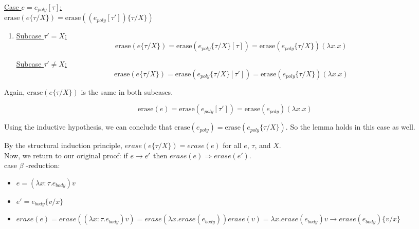 \documentclass[10pt]{article}
\begin{document}
\begin{exercise}
\begin{enumerate}[\hspace{20pt}]
	\underline{Case $e = e_{poly} [\tau]$:} \\
	
	$\text{erase}(e\{\tau / X\}) = \text{erase}((e_{poly} [\tau']) \{\tau / X \})$
	
	\begin{enumerate}[\hspace{20pt}]
		\item
		\underline{Subcase $\tau' = X$:}
		$$\text{erase}(e\{\tau / X\}) = \text{erase}(e_{poly}\{\tau / X\} [\tau]) = 
		\text{erase}(e_{poly}\{\tau / X\}) (\lambda x.x)$$
		
		\underline{Subcase $\tau' \neq X$:} \\
		$$\text{erase}(e\{\tau / X\}) = \text{erase}(e_{poly}\{\tau / X\} [\tau']) = 
		\text{erase}(e_{poly}\{\tau / X\}) (\lambda x.x)$$
	\end{enumerate}
	
	Again, $\text{erase}(e\{\tau / X\})$ is the same in both subcases.
	
	$$\text{erase}(e) = \text{erase}(e_{poly} [\tau']) = \text{erase}(e_{poly}) 
	(\lambda x.x)$$
	
	Using the inductive hypothesis, we can conclude that $\text{erase}(e_{poly}) = 
	\text{erase}(e_{poly}\{\tau / X\})$. So the lemma holds in this case as well.
	\checkmark \\
	
\end{enumerate}

By the structural induction principle, $erase(e\{\tau/X\}) = erase(e)$ for all 
$e$, $\tau$, and $X$. \\



Now, we return to our original proof: if $e \rightarrow e'$ then
$\mathit{erase}(e) \Rightarrow \mathit{erase}(e')$.\\

{\sc case} $\beta$ {\sc -reduction}:\\
\begin{itemize}

\item $e = (\lambda x: \tau. e_{body}) v$

\item $e' = e_{body}\{v/x\}$

\item $\mathit{erase}(e) = \mathit{erase}((\lambda x:\tau. e_{body}) v) = \mathit{erase}(\lambda x.\mathit{erase}(e_{body})) \mathit{erase}(v) = \lambda x.\mathit{erase}(e_{body}) v \rightarrow \mathit{erase}(e_{body})\{v/x\}$


\end{itemize}
\end{exercise}
\end{document}
